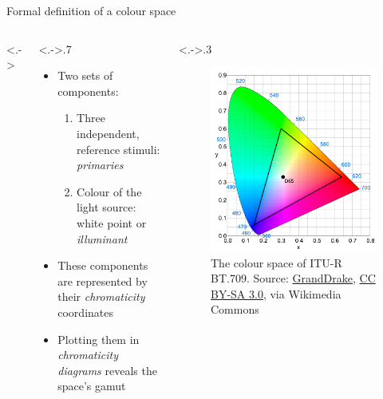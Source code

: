 \documentclass[aspectratio=169,handout]{fireshonks}
\begin{document}
\begin{frame}{Formal definition of a colour space}
    \begin{columns}<.->
        \begin{column}<.->{.7\textwidth}
            \begin{itemize}
                \item Two sets of components:
                      \begin{enumerate}
                          \item Three independent, reference stimuli: \emph{primaries}
                          \item Colour of the light source: white point or \emph{illuminant}
                      \end{enumerate}
                \item These components are represented by their \emph{chromaticity} coordinates
                \item Plotting them in \emph{chromaticity diagrams} reveals the space's gamut
            \end{itemize}
        \end{column}
        \begin{column}<.->{.3\textwidth}
            \begin{figure}
                \includegraphics[width=\columnwidth,keepaspectratio]{figures/bt709.pdf}
                \caption*{The colour space of ITU-R BT.709. Source: \href{https://commons.wikimedia.org/wiki/File:CIExy1931_Rec_709.svg}{GrandDrake}, \href{http://creativecommons.org/licenses/by-sa/3.0/}{CC BY-SA 3.0}, via Wikimedia Commons}
            \end{figure}
        \end{column}
    \end{columns}
\end{frame}
\end{document}
